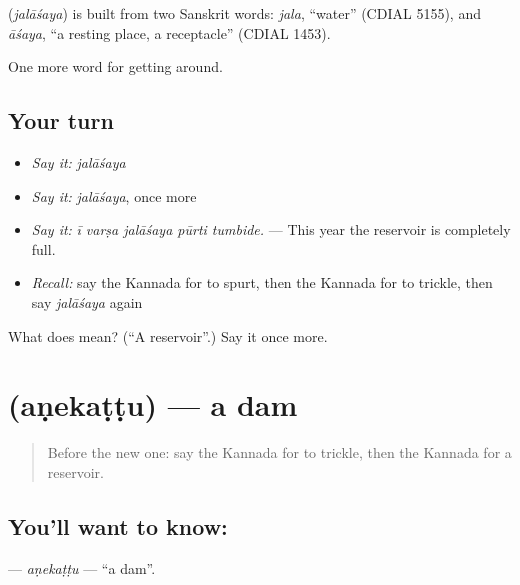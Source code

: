 \begin{cousinweb}
\textbf{} (\emph{jalāśaya}) is built from two Sanskrit words: \emph{jala}, \textquotedblleft{}water\textquotedblright{} (CDIAL 5155), and \emph{āśaya}, \textquotedblleft{}a resting place, a receptacle\textquotedblright{} (CDIAL 1453).
\end{cousinweb}

\begin{grammarlens}[title={What you've built}]
One more word for getting around.
\end{grammarlens}

\subsection*{Your turn}
\begin{itemize}
\raggedright
  \item \emph{Say it:} \emph{jalāśaya}
  \item \emph{Say it:} \emph{jalāśaya}, once more
  \item \emph{Say it:} \emph{ī varṣa jalāśaya pūrti tumbide.} — This year the reservoir is completely full.
  \item \emph{Recall:} say the Kannada for to spurt, then the Kannada for to trickle, then say \emph{jalāśaya} again
\end{itemize}

\begin{tcolorbox}[breakable,colback=teal!4,colframe=teal!35!black,title={Before you move on}]
What does  mean? (\textquotedblleft{}A reservoir\textquotedblright{}.) Say it once more.
\end{tcolorbox}
\section[\texorpdfstring{\kn{ಅಣೆಕಟ್ಟು} (aṇekaṭṭu)}{ಅಣೆಕಟ್ಟು (aṇekaṭṭu)}]{ (aṇekaṭṭu) — a dam}

\label{lesson:KA-C483-anekattu}



\begin{quote}
Before the new one: say the Kannada for to trickle, then the Kannada for a reservoir.
\end{quote}

\subsection*{You'll want to know: }
\textbf{} — \emph{aṇekaṭṭu} — \textquotedblleft{}a dam\textquotedblright{}.

